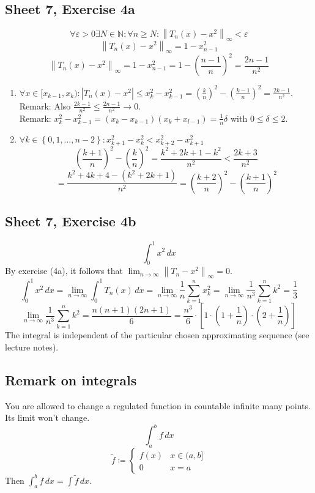 \documentclass{article}
\newcommand{\set}[1]{\left\{#1\right\}}
\newcommand{\norm}[1]{\left\|#1\right\|}
\newcommand{\card}[1]{\left|#1\right|}
\begin{document}
\subsection{Sheet 7, Exercise 4a}

\[ \forall \varepsilon > 0 \exists N \in \mathbb N: \forall n \geq N: \norm{T_n(x) - x^2}_{\infty} < \varepsilon \]
\[ \norm{T_n(x) - x^2}_{\infty} = 1 - x_{n-1}^2 \]
\[ \norm{T_n(x) - x^2}_{\infty} = 1 - x_{n-1}^2 = 1 - \left(\frac{n-1}{n}\right)^2 = \frac{2n-1}{n^2} \]
\begin{enumerate}
  \item $\forall x \in [x_{k-1}, x_k): \card{T_n(x) - x^2} \leq x_k^2 - x_{k-1}^2 = \left(\frac kn\right)^2 - \left(\frac{k-1}{n}\right)^2 = \frac{2k-1}{n^2}$. \\
    Remark: Also $\frac{2k-1}{n^2} \leq \frac{2n - 1}{n^2} \to 0$. \\
    Remark: $x_k^2 - x_{k-1}^2 = (x_k - x_{k-1})(x_k + x_{l-1}) = \frac1n \delta$ with $0 \leq \delta \leq 2$.
  \item $\forall k \in \set{0,1,\dots,n-2}: x_{k+1}^2 - x_k^2 < x_{k+2}^2 - x_{k+1}^2$
    \[ \left(\frac{k+1}{n}\right)^2 - \left(\frac{k}{n}\right)^2 = \frac{k^2 + 2k + 1 - k^2}{n^2} < \frac{2k+3}{n^2} \]
    \[ = \frac{k^2 + 4k + 4 - (k^2 + 2k + 1)}{n^2} = \left(\frac{k+2}{n}\right)^2 - \left(\frac{k+1}{n}\right)^2 \]
\end{enumerate}

\subsection{Sheet 7, Exercise 4b}
\[ \int_0^1 x^2 \, dx \]
By exercise (4a), it follows that $\lim_{n\to\infty} \norm{T_n - x^2}_{\infty} = 0$.
\[ \int_0^1 x^2 \, dx = \lim_{n\to\infty} \int_0^1 T_n(x) \, dx = \lim_{n\to\infty} \frac1n \sum_{k=1}^n x_k^2 = \lim_{n\to\infty} \frac{1}{n^3} \sum_{k=1}^n k^2 = \frac13 \]
\[ \lim_{n\to\infty} \frac{1}{n^3} \sum_{k=1}^n k^2 = \frac{n (n+1) (2n + 1)}{6} = \frac{n^3}{6} \cdot \left[1 \cdot \left(1 + \frac1n\right) \cdot \left(2 + \frac1n\right)\right] \]
The integral is independent of the particular chosen approximating sequence (see lecture notes).

\subsection{Remark on integrals}
You are allowed to change a regulated function in countable infinite many points. Its limit won't change.
\[ \int_a^b f \, dx \]
\[
  \tilde f \coloneqq \begin{cases}
    f(x) & x \in (a,b] \\
    0 & x = a
  \end{cases}
\]
Then $\int_a^b f \, dx = \int \tilde f \, dx$.
\end{document}
